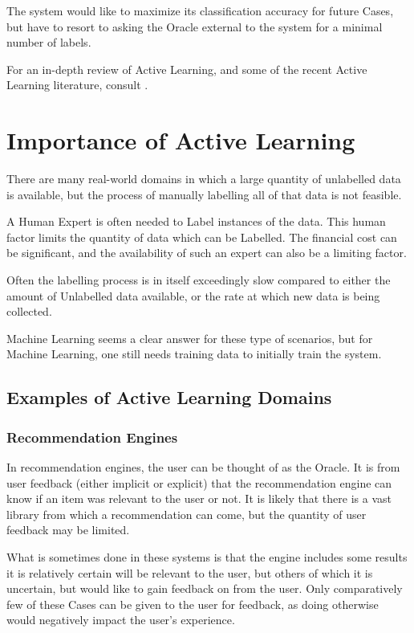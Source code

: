 \documentclass[a4paper,11pt]{report}
\begin{document}
The system would like to maximize its classification accuracy for future Cases, but have to resort to asking the Oracle external to the system for a minimal number of labels.

For an in-depth review of Active Learning, and some of the recent Active Learning literature, consult \citep{Settles2010}.

\section{Importance of Active Learning}
There are many real-world domains in which a large quantity of unlabelled data is available, but the process of manually labelling all of that data is not feasible. 

A Human Expert is often needed to Label instances of the data. This human factor limits the quantity of data which can be Labelled. The financial cost can be significant, and the availability of such an expert can also be a limiting factor.

Often the labelling process is in itself exceedingly slow compared to either the amount of Unlabelled data available, or the rate at which new data is being collected. 

Machine Learning seems a clear answer for these type of scenarios, but for Machine Learning, one still needs training data to initially train the system.

\subsection{Examples of Active Learning Domains}
\subsubsection{Recommendation Engines}
In recommendation engines, the user can be thought of as the Oracle. It is from user feedback (either implicit or explicit) that the recommendation engine can know if an item was relevant to the user or not. It is likely that there is a vast library from which a recommendation can come, but the quantity of user feedback may be limited.

What is sometimes done in these systems is that the engine includes some results it is relatively certain will be relevant to the user, but others of which it is uncertain, but would like to gain feedback on from the user. Only comparatively few of these Cases can be given to the user for feedback, as doing otherwise would negatively impact the user's experience.
\end{document}
